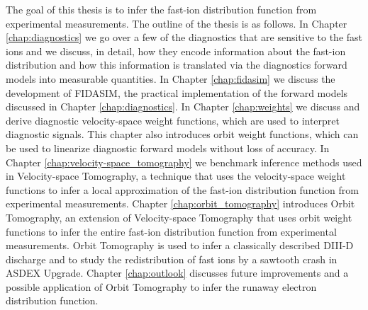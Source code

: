The goal of this thesis is to infer the fast-ion distribution function from experimental measurements. The outline of the thesis is as follows. In Chapter \ref{chap:diagnostics} we go over a few of the diagnostics that are sensitive to the fast ions and we discuss, in detail, how they encode information about the fast-ion distribution and how this information is translated via the diagnostics forward models into measurable quantities. In Chapter \ref{chap:fidasim} we discuss the development of FIDASIM\cite{heidbrink2011code,geiger2013thesis,FIDASIM}, the practical implementation of the forward models discussed in Chapter \ref{chap:diagnostics}. In Chapter \ref{chap:weights} we discuss and derive diagnostic velocity-space weight functions, which are used to interpret diagnostic signals.\cite{heidbrink2007,salewski2011,salewski2012,Muscatello2012,collins2015characterizing,collins2016observation,collins2017phase,collins2016critical,heidbrink2016interpretation} This chapter also introduces orbit weight functions\cite{stagner2017action}, which can be used to linearize diagnostic forward models without loss of accuracy. In Chapter \ref{chap:velocity-space_tomography} we benchmark\cite{jacobsen_stagner2016} inference methods used in Velocity-space Tomography, a technique that uses the velocity-space weight functions to infer a local approximation of the fast-ion distribution function from experimental measurements.\cite{heidbrink2007,salewski2011,salewski2012,Muscatello2012,Salewski2014a,jacobsen2015,salewski2013_tomography,salewski2014_tomography,salewski2016,salewski2016high,weiland2016}
Chapter \ref{chap:orbit_tomography} introduces Orbit Tomography, an extension of Velocity-space Tomography that uses orbit weight functions to infer the entire fast-ion distribution function from experimental measurements. Orbit Tomography is used to infer a classically described DIII-D discharge and to study the redistribution of fast ions by a sawtooth crash in ASDEX Upgrade. Chapter \ref{chap:outlook} discusses future improvements and a possible application of Orbit Tomography to infer the runaway electron distribution function.

